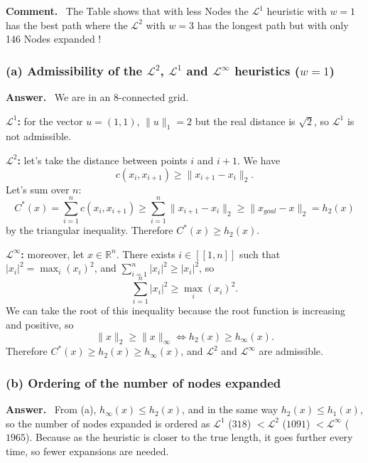 \documentclass[11pt]{article}
\newenvironment{answer}
  {\par\medskip\noindent\textbf{Answer.}\ }
  {\par\medskip}
\newenvironment{figcomment}
  {\par\smallskip\noindent\textbf{Comment.}\ }
  {\par\medskip}
\newcommand{\Lone}{\mathcal{L}^1}
\newcommand{\Ltwo}{\mathcal{L}^2}
\newcommand{\Linf}{\mathcal{L}^\infty}
\begin{document}
\begin{figcomment}
  The Table shows that with less Nodes the $\Lone$ heuristic with $w=1$ has the best path where the $\Ltwo$ with $w=3$ has the longest path but with only 146 Nodes expanded !
\end{figcomment}

\subsubsection*{(a) Admissibility of the $\Ltwo$, $\Lone$ and $\Linf$ heuristics ($w = 1$)}
\begin{answer}
  We are in an 8-connected grid.

  \medskip\noindent\textbf{$\Lone$:} for the vector $u = (1, 1)$, $\|u\|_1 = 2$ but the real distance is $\sqrt{2}$, so $\Lone$ is not admissible.

  \medskip\noindent\textbf{$\Ltwo$:} let's take the distance between points $i$ and $i+1$. We have
  \[
    c(x_i, x_{i+1}) \geq \|x_{i+1} - x_i\|_2 .
  \]
  Let's sum over $n$:
  \[
    C^*(x) = \sum_{i=1}^{n} c(x_i, x_{i+1}) \geq \sum_{i=1}^{n} \|x_{i+1} - x_i\|_2 \geq \|x_{goal} - x\|_2 = h_2(x)
  \]
  by the triangular inequality. Therefore $C^*(x) \geq h_2(x)$.

  \medskip\noindent\textbf{$\Linf$:} moreover, let $x \in \mathbb{R}^n$. There exists $i \in [\![1, n]\!]$ such that $|x_i|^2 = \max_i (x_i)^2$, and $\sum_{i=1}^{n} |x_i|^2 \geq |x_i|^2$, so
  \[
    \sum_{i=1}^{n} |x_i|^2 \geq \max_i (x_i)^2 .
  \]
  We can take the root of this inequality because the root function is increasing and positive, so
  \[
    \|x\|_2 \geq \|x\|_\infty \iff h_2(x) \geq h_\infty(x) .
  \]
  Therefore $C^*(x) \geq h_2(x) \geq h_\infty(x)$, and $\Ltwo$ and $\Linf$ are admissible.
\end{answer}

\subsubsection*{(b) Ordering of the number of nodes expanded}
\begin{answer}
  From (a), $h_\infty(x) \leq h_2(x)$, and in the same way $h_2(x) \leq h_1(x)$, so the number of nodes expanded is ordered as $\Lone$ ($318$) $< \Ltwo$ ($1091$) $< \Linf$ ($1965$).
  Because as the heuristic is closer to the true length, it goes further every time, so fewer expansions are needed.
\end{answer}
\end{document}
